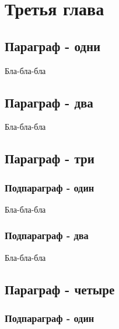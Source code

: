 \chapter{Третья глава} \label{chapt3}

\section{Параграф - одни} \label{sect3_0}
Бла-бла-бла



\section{Параграф - два} \label{sect3_2}

Бла-бла-бла


\section{Параграф - три} \label{sect3_1} %

\subsection{Подпараграф - один} \label{subsect3_1}

Бла-бла-бла

\subsection{Подпараграф - два} \label{subsect3_2}

Бла-бла-бла


\section{Параграф - четыре} \label{sect3_3}

\subsection{Подпараграф - один} \label{subsect3_3_1}

